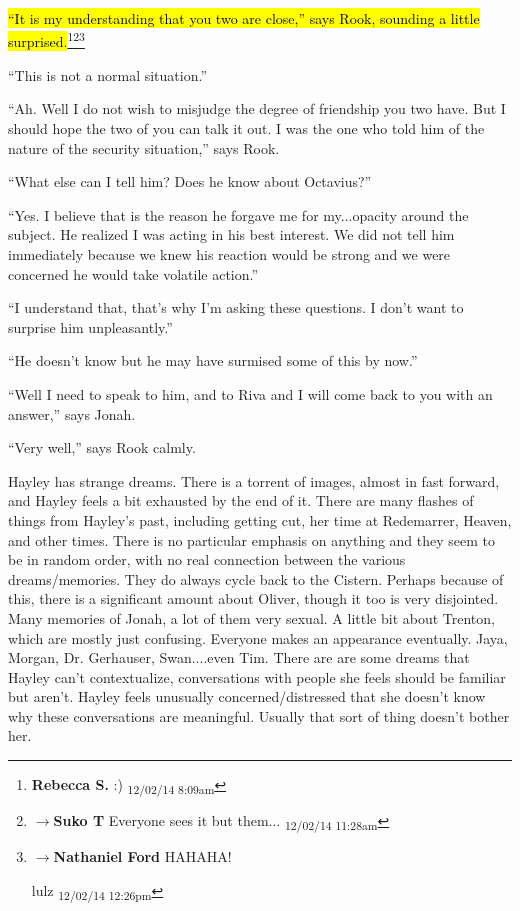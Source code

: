 \hl{``It is my understanding that you two are close,'' says Rook, sounding a little surprised.}\footnote{\textbf{Rebecca S. }:) \textsubscript{12/02/14 8:09am}}\footnote{$\rightarrow$\textbf{Suko T }Everyone sees it but them... \textsubscript{12/02/14 11:28am}}\footnote{$\rightarrow$\textbf{Nathaniel Ford }HAHAHA!

lulz \textsubscript{12/02/14 12:26pm}}

``This is not a normal situation.''

``Ah. Well I do not wish to misjudge the degree of friendship you two have.  But I should hope the two of you can talk it out.  I was the one who told him of the nature of the security situation,'' says Rook.

``What else can I tell him?  Does he know about Octavius?''

``Yes.  I believe that is the reason he forgave me for my...opacity around the subject.  He realized I was acting in his best interest.  We did not tell him immediately because we knew his reaction would be strong and we were concerned he would take volatile action.''

``I understand that, that's why I'm asking these questions.  I don't want to surprise him unpleasantly.''

``He doesn't know but he may have surmised some of this by now.''

``Well I need to speak to him, and to Riva and I will come back to you with an answer,'' says Jonah.

``Very well,'' says Rook calmly.





Hayley has strange dreams.  There is a torrent of images, almost in fast forward, and Hayley feels a bit exhausted by the end of it.  There are many flashes of things from Hayley's past, including getting cut, her time at Redemarrer, Heaven, and other times.  There is no particular emphasis on anything and they seem to be in random order, with no real connection between the various dreams/memories.  They do always cycle back to the Cistern.  Perhaps because of this, there is a significant amount about Oliver, though it too is very disjointed.  Many memories of Jonah, a lot of them very sexual.  A little bit about Trenton, which are mostly just confusing.  Everyone makes an appearance eventually.  Jaya, Morgan, Dr. Gerhauser, Swan....even Tim.  There are are some dreams that Hayley can't contextualize, conversations with people she feels should be familiar but aren't.  Hayley feels unusually concerned/distressed that she doesn't know why these conversations are meaningful.  Usually that sort of thing doesn't bother her.



